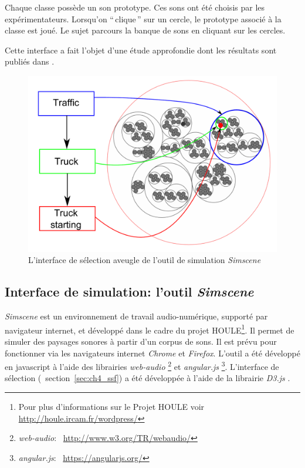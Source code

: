 Chaque classe possède un son prototype. Ces sons ont été choisis par les expérimentateurs. Lorsqu’on ``\,clique\,'' sur un cercle, le prototype associé à la classe est joué. Le sujet parcours la banque de sons en cliquant sur les cercles.

Cette interface a fait l'objet d'une étude approfondie dont les résultats sont publiés dans \citep{lafay2016JAES}. 

\begin{figure}[bth]
        \myfloatalign
        \includegraphics[width=.8\linewidth]{gfx/SSF}
       \caption{L'interface de sélection aveugle de l'outil de simulation \emph{Simscene}}\label{fig:ssf}
\end{figure}



\subsection{Interface de simulation: l'outil \emph{Simscene}}
\label{sec:ch4_simscene}

\emph{Simscene} est un environnement de travail audio-numérique, supporté par navigateur internet, et développé dans le cadre du projet HOULE\footnote{Pour plus d’informations sur le Projet HOULE voir \url{http://houle.ircam.fr/wordpress/}}. Il permet de simuler des paysages sonores à partir d'un corpus de sons. Il est prévu pour fonctionner via les navigateurs internet \emph{Chrome} et \emph{Firefox}. L'outil a été développé en javascript à l'aide des librairies \emph{web-audio} \footnote{\emph{web-audio}: \Cf~\url{http://www.w3.org/TR/webaudio/}} et \emph{angular.js} \footnote{\emph{angular.js}: \Cf~\url{https://angularjs.org/}}. L'interface de sélection (\cf~section~\ref{sec:ch4_ssf}) a été développée à l'aide de la librairie \emph{D3.js} \citep{d32011}.

